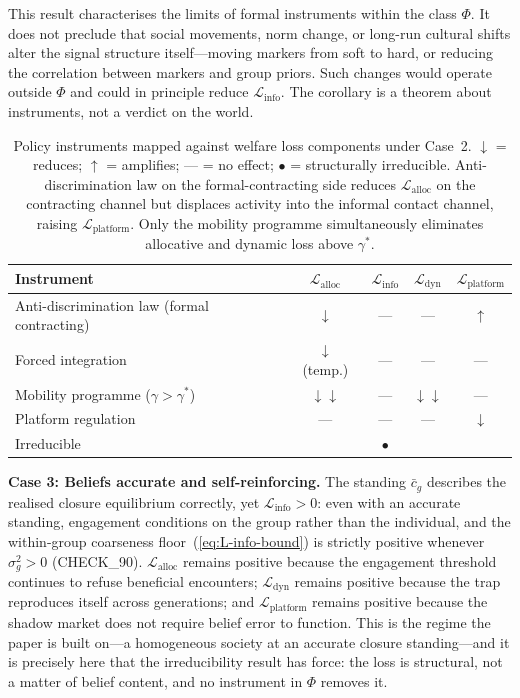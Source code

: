 \documentclass[12pt,a4paper]{article}
\theoremstyle{definition}
\numberwithin{proposition}{section}
\begin{document}
This result characterises the limits of formal instruments within
the class $\Phi$. It does not preclude that social movements, norm
change, or long-run cultural shifts alter the signal structure
itself---moving markers from soft to hard, or reducing the
correlation between markers and group priors. Such changes would
operate outside $\Phi$ and could in principle reduce
$\mathcal{L}_{\text{info}}$. The corollary is a theorem about
instruments, not a verdict on the world.

\begin{table}[t]
\centering
\renewcommand{\arraystretch}{1.4}
\small
\begin{tabular}{lcccc}
\toprule
\textbf{Instrument} &
$\mathcal{L}_{\text{alloc}}$ &
$\mathcal{L}_{\text{info}}$ &
$\mathcal{L}_{\text{dyn}}$ &
$\mathcal{L}_{\text{platform}}$ \\
\midrule
Anti-discrimination law (formal contracting)
                          & $\downarrow$ & --- & --- & $\uparrow$ \\
Forced integration        & $\downarrow$ (temp.) & --- & --- & --- \\
Mobility programme ($\gamma > \gamma^*$) & $\downarrow\downarrow$ & --- & $\downarrow\downarrow$ & --- \\
Platform regulation       & --- & --- & --- & $\downarrow$ \\
\midrule
Irreducible               & & $\bullet$ & & \\
\bottomrule
\end{tabular}
\caption{Policy instruments mapped against welfare loss components
under Case~2. $\downarrow$ = reduces; $\uparrow$ = amplifies;
--- = no effect; $\bullet$ = structurally irreducible.
Anti-discrimination law on the formal-contracting side reduces
$\mathcal{L}_{\text{alloc}}$ on the contracting channel but
displaces activity into the informal contact channel, raising
$\mathcal{L}_{\text{platform}}$. Only the mobility programme
simultaneously eliminates allocative and dynamic loss above
$\gamma^*$.}
\label{tab:welfare-addendum}
\end{table}

\textbf{Case 3: Beliefs accurate and self-reinforcing.}
The standing $\bar{c}_g$ describes the realised closure equilibrium
correctly, yet $\mathcal{L}_{\text{info}} > 0$: even with an accurate
standing, engagement conditions on the group rather than the
individual, and the within-group coarseness
floor~(\ref{eq:L-info-bound}) is strictly positive whenever
$\sigma^2_g > 0$ (CHECK\_90). $\mathcal{L}_{\text{alloc}}$ remains
positive because the engagement threshold continues to refuse
beneficial encounters; $\mathcal{L}_{\text{dyn}}$ remains positive
because the trap reproduces itself across generations; and
$\mathcal{L}_{\text{platform}}$ remains positive because the shadow
market does not require belief error to function. This is the regime
the paper is built on---a homogeneous society at an accurate closure
standing---and it is precisely here that the irreducibility result has
force: the loss is structural, not a matter of belief content, and no
instrument in $\Phi$ removes it.
\end{document}
